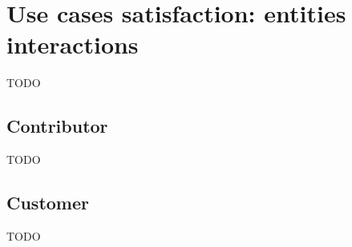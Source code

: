 \section{Use cases satisfaction: entities interactions}
TODO

\subsection{Contributor}
TODO

\subsection{Customer}
TODO